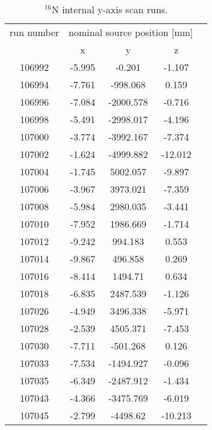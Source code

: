 \begin{table}[ht]
		\caption[]{$^{16}$N internal y-axis scan runs.}
		\label{table:n16scanTable_yscan}
				\centering
	\begin{tabular*}{90mm}{c@{\extracolsep{\fill}}*4c}
		\toprule 
		run number  & \multicolumn{3}{c}{nominal source position [mm]}  \\
		\cline{2-4}
		& x & y & z\\
		\midrule        
        106992 & -5.995 & -0.201 & -1.107\\
        106994 & -7.761 & -998.068 & 0.159\\
        106996 & -7.084 & -2000.578 & -0.716\\
        106998 & -5.491 & -2998.017 & -4.196\\
        107000 & -3.774 & -3992.167 & -7.374\\
        107002 & -1.624 & -4999.882 & -12.012\\
        107004 & -1.745 & 5002.057 & -9.897\\
        107006 & -3.967 & 3973.021 & -7.359\\
        107008 & -5.984 & 2980.035 & -3.441\\
        107010 & -7.952 & 1986.669 & -1.714\\
        107012 & -9.242 & 994.183 & 0.553\\
        107014 & -9.867 & 496.858 & 0.269\\
        107016 & -8.414 & 1494.71 & 0.634\\
        107018 & -6.835 & 2487.539 & -1.126\\
        107026 & -4.949 & 3496.338 & -5.971\\
        107028 & -2.539 & 4505.371 & -7.453\\
        107030 & -7.711 & -501.268 & 0.126\\
        107033 & -7.534 & -1494.927 & -0.096\\
        107035 & -6.349 & -2487.912 & -1.434\\
        107043 & -4.366 & -3475.769 & -6.019\\
        107045 & -2.799 & -4498.62 & -10.213\\
        		\bottomrule	
       	\end{tabular*}
   \end{table} 

